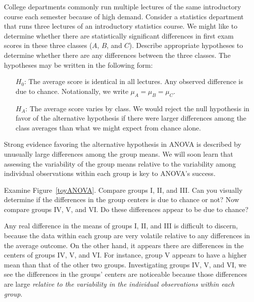 \begin{examplewrap}
\begin{nexample}{College departments commonly run multiple lectures of the same introductory course each semester because of high demand. Consider a statistics department that runs three lectures of an introductory statistics course. We might like to determine whether there are statistically significant differences in first exam scores in these three classes ($A$, $B$, and $C$). Describe appropriate hypotheses to determine whether there are any differences between the three classes.} \label{firstExampleForThreeStatisticsClassesAndANOVA}
The hypotheses may be written in the following form:
\begin{itemize}
\setlength{\itemsep}{0mm}
\item[$H_0$:] The average score is identical in all lectures. Any observed difference is due to chance. Notationally, we write $\mu_A=\mu_B=\mu_C$.
\item[$H_A$:] The average score varies by class. We would reject the null hypothesis in favor of the alternative hypothesis if there were larger differences among the class averages than what we might expect from chance alone.
\end{itemize}
\end{nexample}
\end{examplewrap}

Strong evidence favoring the alternative hypothesis in ANOVA is described by unusually large differences among the group means. We will soon learn that assessing the variability of the group means relative to the variability among individual observations within each group is key to ANOVA's success.

\begin{examplewrap}
\begin{nexample}{Examine Figure~\ref{toyANOVA}. Compare groups I, II, and III. Can you visually determine if the differences in the group centers is due to chance or not? Now compare groups IV, V, and VI. Do these differences appear to be due to chance?}

Any real difference in the means of groups I, II, and III is difficult to discern, because the data within each group are very volatile relative to any differences in the average outcome. On the other hand, it appears there are differences in the centers of groups IV, V, and VI. For instance, group V appears to have a higher mean than that of the other two groups. Investigating groups IV, V, and VI, we see the differences in the groups' centers are noticeable because those differences are large \emph{relative to the variability in the individual observations within each group}.
\end{nexample}
\end{examplewrap}

